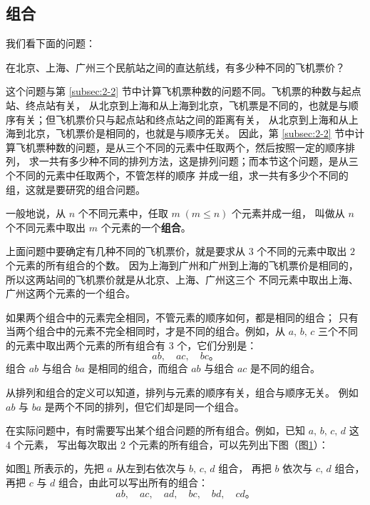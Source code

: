 \subsection{组合}\label{subsec:2-4}

我们看下面的问题：

在北京、上海、广州三个民航站之间的直达航线，有多少种不同的飞机票价？

这个问题与第 \ref{subsec:2-2} 节中计算飞机票种数的问题不同。飞机票的种数与起点站、终点站有关，
从北京到上海和从上海到北京，飞机票是不同的，也就是与顺序有关；但飞机票价只与起点站和终点站之间的距离有关，
从北京到上海和从上海到北京，飞机票价是相同的，也就是与顺序无关。
因此，第 \ref{subsec:2-2} 节中计算飞机票种数的问题，是从三个不同的元素中任取两个，然后按照一定的顺序排列，
求一共有多少种不同的排列方法，这是排列问题；而本节这个问题，是从三个不同的元素中任取两个，不管怎样的顺序
并成一组，求一共有多少个不同的组，这就是要研究的组合问题。

一般地说，从 $n$ 个不同元素中，任取 $m \; (m \leqslant n)$ 个元素并成一组，
叫做从 $n$ 个不同元素中取出 $m$ 个元素的一个\textbf{组合}。

上面问题中要确定有几种不同的飞机票价，就是要求从 $3$ 个不同的元素中取出 $2$ 个元素的所有组合的个数。
因为上海到广州和广州到上海的飞机票价是相同的，所以这两站间的飞机票价就是从北京、上海、广州这三个
不同元素中取出上海、广州这两个元素的一个组合。

如果两个组合中的元素完全相同，不管元素的顺序如何，都是相同的组合；
只有当两个组合中的元素不完全相同时，才是不同的组合。例如，从 $a,\, b,\, c$
三个不同的元素中取出两个元素的所有组合有 $3$ 个，它们分别是：
$$ ab,\quad ac,\quad bc \text{。} $$
组合 $ab$ 与组合 $ba$ 是相同的组合，而组合 $ab$ 与组合 $ac$ 是不同的组合。

从排列和组合的定义可以知道，排列与元素的顺序有关，组合与顺序无关。
例如 $ab$ 与 $ba$ 是两个不同的排列，但它们却是同一个组合。

在实际问题中，有时需要写出某个组合问题的所有组合。例如，已知 $a,\, b,\, c,\, d$ 这 $4$ 个元素，
写出每次取出 $2$ 个元素的所有组合，可以先列出下图（图\ref{fig:2-7}）：

\begin{figure}[htbp]
    \centering
    
    \caption{}\label{fig:2-7}
\end{figure}

如图\ref{fig:2-7} 所表示的，先把 $a$ 从左到右依次与 $b,\, c,\, d$ 组合，
再把 $b$ 依次与 $c,\, d$ 组合， 再把 $c$ 与 $d$ 组合，由此可以写出所有的组合：
$$ ab,\quad ac,\quad ad,\quad bc,\quad bd,\quad cd \text{。} $$

